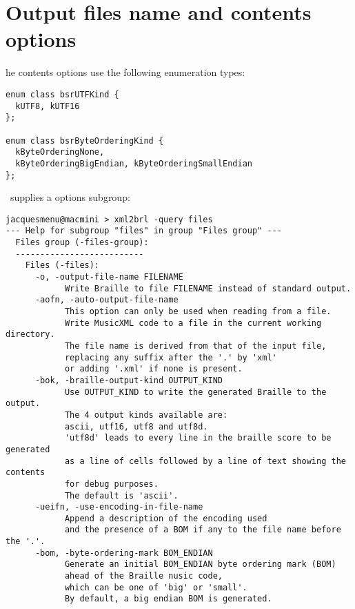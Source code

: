 \section{Output files name and contents options}

he contents options use the following enumeration types:
\begin{lstlisting}[language=CPlusPlus]
enum class bsrUTFKind {
  kUTF8, kUTF16
};

enum class bsrByteOrderingKind {
  kByteOrderingNone,
  kByteOrderingBigEndian, kByteOrderingSmallEndian
};
\end{lstlisting}

\xmlToBrl\ supplies a  options subgroup:
\begin{lstlisting}[language=Terminal]
jacquesmenu@macmini > xml2brl -query files
--- Help for subgroup "files" in group "Files group" ---
  Files group (-files-group):
  --------------------------
    Files (-files):
      -o, -output-file-name FILENAME
            Write Braille to file FILENAME instead of standard output.
      -aofn, -auto-output-file-name
            This option can only be used when reading from a file.
            Write MusicXML code to a file in the current working directory.
            The file name is derived from that of the input file,
            replacing any suffix after the '.' by 'xml'
            or adding '.xml' if none is present.
      -bok, -braille-output-kind OUTPUT_KIND
            Use OUTPUT_KIND to write the generated Braille to the output.
            The 4 output kinds available are:
            ascii, utf16, utf8 and utf8d.
            'utf8d' leads to every line in the braille score to be generated
            as a line of cells followed by a line of text showing the contents
            for debug purposes.
            The default is 'ascii'.
      -ueifn, -use-encoding-in-file-name
            Append a description of the encoding used
            and the presence of a BOM if any to the file name before the '.'.
      -bom, -byte-ordering-mark BOM_ENDIAN
            Generate an initial BOM_ENDIAN byte ordering mark (BOM)
            ahead of the Braille nusic code,
            which can be one of 'big' or 'small'.
            By default, a big endian BOM is generated.
\end{lstlisting}


